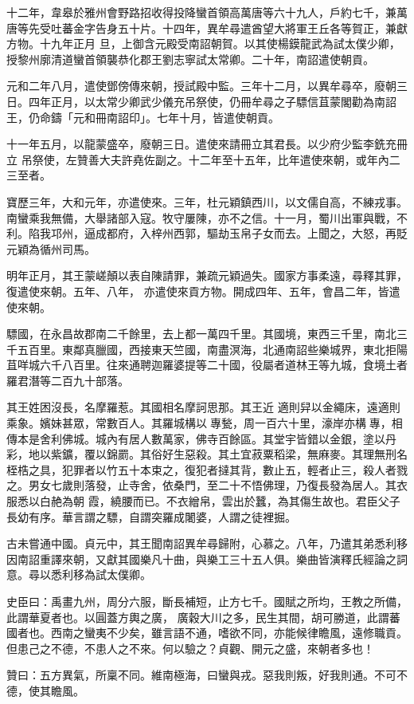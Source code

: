 \begin{pinyinscope}
 十二年，韋皋於雅州會野路招收得投降蠻首領高萬唐等六十九人，戶約七千，兼萬唐等先受吐蕃金字告身五十片。十四年，異牟尋遣酋望大將軍王丘各等賀正，兼獻方物。十九年正月
 旦，上御含元殿受南詔朝賀。以其使楊鏌龍武為試太僕少卿，授黎州廓清道蠻首領襲恭化郡王劉志寧試太常卿。二十年，南詔遣使朝貢。



 元和二年八月，遣使鄧傍傳來朝，授試殿中監。三年十二月，以異牟尋卒，廢朝三日。四年正月，以太常少卿武少儀充吊祭使，仍冊牟尋之子驃信苴蒙閣勸為南詔王，仍命鑄「元和冊南詔印」。七年十月，皆遣使朝貢。



 十一年五月，以龍蒙盛卒，廢朝三日。遣使來請冊立其君長。以少府少監李銑充冊立
 吊祭使，左贊善大夫許堯佐副之。十二年至十五年，比年遣使來朝，或年內二三至者。



 寶歷三年，大和元年，亦遣使來。三年，杜元穎鎮西川，以文儒自高，不練戎事。南蠻乘我無備，大舉諸部入寇。牧守屢陳，亦不之信。十一月，蜀川出軍與戰，不利。陷我邛州，逼成都府，入梓州西郭，驅劫玉帛子女而去。上聞之，大怒，再貶元穎為循州司馬。



 明年正月，其王蒙嵯顛以表自陳請罪，兼疏元穎過失。國家方事柔遠，尋釋其罪，復遣使來朝。五年、八年，
 亦遣使來貢方物。開成四年、五年，會昌二年，皆遣使來朝。



 驃國，在永昌故郡南二千餘里，去上都一萬四千里。其國境，東西三千里，南北三千五百里。東鄰真臘國，西接東天竺國，南盡溟海，北通南詔些樂城界，東北拒陽苴咩城六千八百里。往來通聘迦羅婆提等二十國，役屬者道林王等九城，食境土者羅君潛等二百九十部落。



 其王姓困沒長，名摩羅惹。其國相名摩訶思那。其王近
 適則舁以金繩床，遠適則乘象。嬪妹甚眾，常數百人。其羅城構以專甃，周一百六十里，濠岸亦構專，相傳本是舍利佛城。城內有居人數萬家，佛寺百餘區。其堂宇皆錯以金銀，塗以丹彩，地以紫鑛，覆以錦罽。其俗好生惡殺。其土宜菽粟稻梁，無麻麥。其理無刑名桎梏之具，犯罪者以竹五十本束之，復犯者撻其背，數止五，輕者止三，殺人者戮之。男女七歲則落發，止寺舍，依桑門，至二十不悟佛理，乃復長發為居人。其衣服悉以白赩為朝
 霞，繞腰而已。不衣繒帛，雲出於蠶，為其傷生故也。君臣父子長幼有序。華言謂之驃，自謂突羅成闍婆，人謂之徒裡掘。



 古未嘗通中國。貞元中，其王聞南詔異牟尋歸附，心慕之。八年，乃遣其弟悉利移因南詔重譯來朝，又獻其國樂凡十曲，與樂工三十五人俱。樂曲皆演釋氏經論之詞意。尋以悉利移為試太僕卿。



 史臣曰：禹畫九州，周分六服，斷長補短，止方七千。國賦之所均，王教之所備，此謂華夏者也。以圓蓋方輿之廣，
 廣穀大川之多，民生其間，胡可勝道，此謂蕃國者也。西南之蠻夷不少矣，雖言語不通，嗜欲不同，亦能候律瞻風，遠修職貢。但患己之不德，不患人之不來。何以驗之？貞觀、開元之盛，來朝者多也！



 贊曰：五方異氣，所稟不同。維南極海，曰蠻與戎。惡我則叛，好我則通。不可不德，使其瞻風。



\end{pinyinscope}